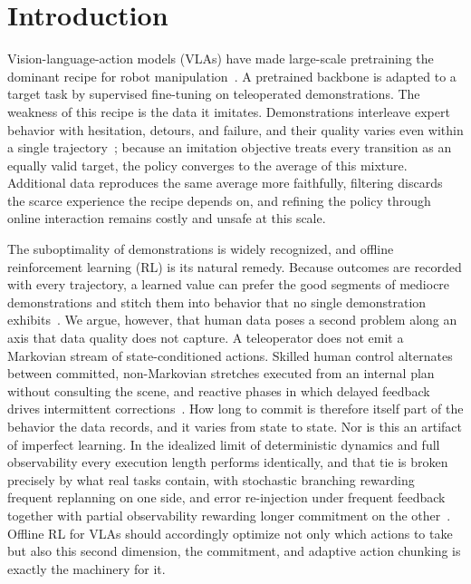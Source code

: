 
\section{Introduction}
\label{sec:intro}

Vision-language-action models (VLAs) have made large-scale pretraining the dominant recipe for robot
manipulation~\citep{rt2, openvla, pi0}. A pretrained backbone is adapted to a target task by
supervised fine-tuning on teleoperated demonstrations. The weakness of this recipe is the data it
imitates. Demonstrations interleave expert behavior with hesitation, detours, and failure, and their
quality varies even within a single trajectory~\citep{grrl, reinbot}; because an imitation objective
treats every transition as an equally valid target, the policy converges to the average of this
mixture. Additional data reproduces the same average more faithfully, filtering discards the scarce
experience the recipe depends on, and refining the policy through online interaction remains costly
and unsafe at this scale.

The suboptimality of demonstrations is widely recognized, and offline reinforcement learning (RL) is
its natural remedy. Because outcomes are recorded with every trajectory, a learned value can prefer
the good segments of mediocre demonstrations and stitch them into behavior that no single
demonstration exhibits~\citep{levine2020offline, fu2020d4rl}. We argue, however, that human data
poses a second problem along an axis that data quality does not capture. A teleoperator does not
emit a Markovian stream of state-conditioned actions. Skilled human control alternates between
committed, non-Markovian stretches executed from an internal plan without consulting the scene, and
reactive phases in which delayed feedback drives intermittent
corrections~\citep{woodworth1899, todorov2002, gawthrop2011}. How long to commit is therefore itself
part of the behavior the data records, and it varies from state to state. Nor is this an artifact
of imperfect learning. In the idealized limit of deterministic dynamics and full observability every
execution length performs identically, and that tie is broken precisely by what real tasks contain,
with stochastic branching rewarding frequent replanning on one side, and error re-injection under
frequent feedback together with partial observability rewarding longer commitment on the
other~\citep{zhang2025chunking, metelli2020persistence}. Offline RL for VLAs should
accordingly optimize not only which actions to take but also this second dimension, the commitment,
and adaptive action chunking is exactly the machinery for it.

